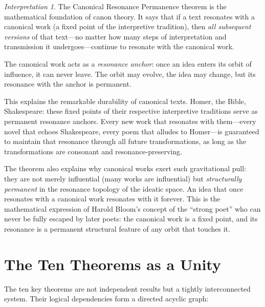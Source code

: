\documentclass[11pt,openany]{book}
\theoremstyle{definition}
\theoremstyle{plain}
\theoremstyle{remark}
\newtheorem{interpretation}[axiom]{Interpretation}
\begin{document}
\begin{interpretation}
The Canonical Resonance Permanence theorem is the mathematical foundation of canon theory. It says that if a text resonates with a canonical work (a fixed point of the interpretive tradition), then \emph{all subsequent versions} of that text---no matter how many steps of interpretation and transmission it undergoes---continue to resonate with the canonical work.

The canonical work acts as a \emph{resonance anchor}: once an idea enters its orbit of influence, it can never leave. The orbit may evolve, the idea may change, but its resonance with the anchor is permanent.

This explains the remarkable durability of canonical texts. Homer, the Bible, Shakespeare: these fixed points of their respective interpretive traditions serve as permanent resonance anchors. Every new work that resonates with them---every novel that echoes Shakespeare, every poem that alludes to Homer---is guaranteed to maintain that resonance through all future transformations, as long as the transformations are consonant and resonance-preserving.

The theorem also explains why canonical works exert such gravitational pull: they are not merely influential (many works are influential) but \emph{structurally permanent} in the resonance topology of the ideatic space. An idea that once resonates with a canonical work resonates with it forever. This is the mathematical expression of Harold Bloom's concept of the ``strong poet'' who can never be fully escaped by later poets: the canonical work is a fixed point, and its resonance is a permanent structural feature of any orbit that touches it.
\end{interpretation}

\section{The Ten Theorems as a Unity}

The ten key theorems are not independent results but a tightly interconnected system. Their logical dependencies form a directed acyclic graph:
\end{document}
